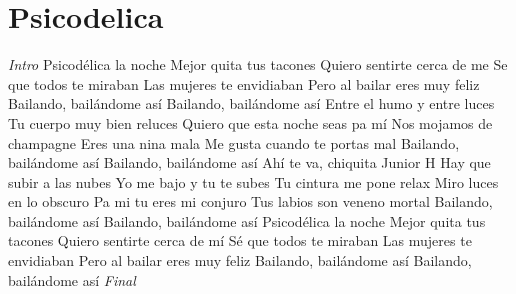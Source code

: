 \section{Psicodelica}

\noindent
\vspace{1cm}

\begin{guitar}
	\begin{multicols}{2}
		\textit{Intro}
		Psicodélica la noche
		Mejor quita tus tacones
		Quiero sentirte cerca de me
		Se que todos te miraban
		Las mujeres te envidiaban
		Pero al bailar eres muy feliz
		Bailando, bailándome así
		Bailando, bailándome así
		Entre el humo y entre luces
		Tu cuerpo muy bien reluces
		Quiero que esta noche seas pa mí
		Nos mojamos de champagne
		Eres una nina mala
		Me gusta cuando te portas mal
		Bailando, bailándome así
		Bailando, bailándome así
		Ahí te va, chiquita
		Junior H
		Hay que subir a las nubes
		Yo me bajo y tu te subes
		Tu cintura me pone relax
		Miro luces en lo obscuro
		Pa mi tu eres mi conjuro
		Tus labios son veneno mortal
		Bailando, bailándome así
		Bailando, bailándome así
		Psicodélica la noche
		Mejor quita tus tacones
		Quiero sentirte cerca de mí
		Sé que todos te miraban
		Las mujeres te envidiaban
		Pero al bailar eres muy feliz
		Bailando, bailándome así
		Bailando, bailándome así
		\textit{Final}
	\end{multicols}
\end{guitar}
